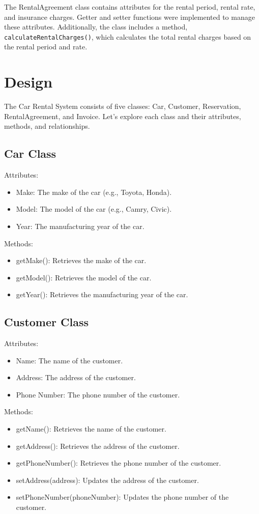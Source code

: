 \documentclass{article}
\begin{document}
The RentalAgreement class contains attributes for the rental period, rental rate, and insurance charges. Getter and setter functions were implemented to manage these attributes. Additionally, the class includes a method, \texttt{calculateRentalCharges()}, which calculates the total rental charges based on the rental period and rate.

\section{Design}

The Car Rental System consists of five classes: Car, Customer, Reservation, RentalAgreement, and Invoice. Let's explore each class and their attributes, methods, and relationships.

\subsection{Car Class}
Attributes:
\begin{itemize}
    \item Make: The make of the car (e.g., Toyota, Honda).
    \item Model: The model of the car (e.g., Camry, Civic).
    \item Year: The manufacturing year of the car.
\end{itemize}

Methods:
\begin{itemize}
    \item getMake(): Retrieves the make of the car.
    \item getModel(): Retrieves the model of the car.
    \item getYear(): Retrieves the manufacturing year of the car.
\end{itemize}

\subsection{Customer Class}
Attributes:
\begin{itemize}
    \item Name: The name of the customer.
    \item Address: The address of the customer.
    \item Phone Number: The phone number of the customer.
\end{itemize}

Methods:
\begin{itemize}
    \item getName(): Retrieves the name of the customer.
    \item getAddress(): Retrieves the address of the customer.
    \item getPhoneNumber(): Retrieves the phone number of the customer.
    \item setAddress(address): Updates the address of the customer.
    \item setPhoneNumber(phoneNumber): Updates the phone number of the customer.
\end{itemize}
\end{document}
